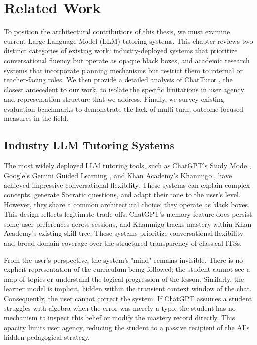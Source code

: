 \documentclass[logo,bsc,singlespacing,parskip,online]{infthesis}
\begin{document}
\chapter{Related Work}

To position the architectural contributions of this thesis, we must examine current Large Language Model (LLM) tutoring systems. This chapter reviews two distinct categories of existing work: industry-deployed systems that prioritize conversational fluency but operate as opaque black boxes, and academic research systems that incorporate planning mechanisms but restrict them to internal or teacher-facing roles. We then provide a detailed analysis of ChatTutor \citep{chen2024chattutor}, the closest antecedent to our work, to isolate the specific limitations in user agency and representation structure that we address. Finally, we survey existing evaluation benchmarks to demonstrate the lack of multi-turn, outcome-focused measures in the field.

\section{Industry LLM Tutoring Systems}

The most widely deployed LLM tutoring tools, such as ChatGPT's Study Mode \citep{openai2025studymode}, Google's Gemini Guided Learning \citep{google2025guided}, and Khan Academy's Khanmigo \citep{khanmigoParents}, have achieved impressive conversational flexibility. These systems can explain complex concepts, generate Socratic questions, and adapt their tone to the user's level. However, they share a common architectural choice: they operate as black boxes. This design reflects legitimate trade-offs. ChatGPT's memory feature \citep{openai2024memory} does persist some user preferences across sessions, and Khanmigo tracks mastery within Khan Academy's existing skill tree. These systems prioritize conversational flexibility and broad domain coverage over the structured transparency of classical ITSs.

From the user's perspective, the system's "mind" remains invisible. There is no explicit representation of the curriculum being followed; the student cannot see a map of topics or understand the logical progression of the lesson. Similarly, the learner model is implicit, hidden within the transient context window of the chat. Consequently, the user cannot correct the system. If ChatGPT assumes a student struggles with algebra when the error was merely a typo, the student has no mechanism to inspect this belief or modify the mastery record directly. This opacity limits user agency, reducing the student to a passive recipient of the AI's hidden pedagogical strategy.
\end{document}
